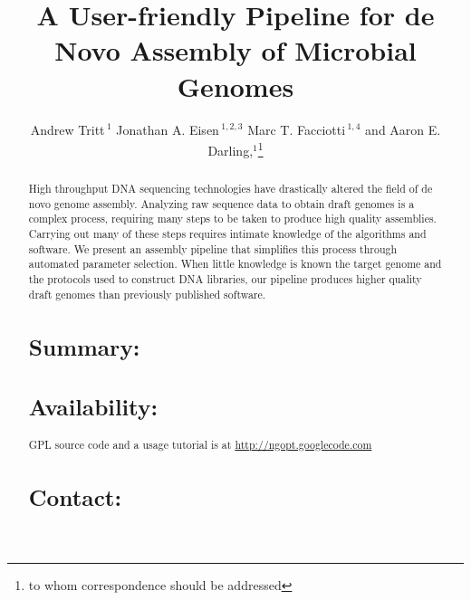 \documentclass{bioinfo}
\begin{document}

\title[a5]{A User-friendly Pipeline for de Novo Assembly of Microbial Genomes}
\author[Tritt \textit{et~al}]{Andrew Tritt\,$^{1}$ Jonathan A. Eisen\,$^{1,2,3}$ Marc T. Facciotti\,$^{1,4}$ and Aaron E. Darling,$^{1}$\footnote{to whom correspondence should be addressed}}
\address{$^{1}$Genome Center, $^{2}$ Dept. of Evolution and Ecology, $^{3}$ Medical Microbiology and Immunology, 
$^{4}$ Biomedical Engineering, University of California-Davis, Davis, CA 95616.}



\maketitle

\begin{abstract}
High throughput DNA sequencing technologies have drastically altered the field of de novo genome assembly. Analyzing
raw sequence data to obtain draft genomes is a complex process, requiring many steps to be taken to produce high
quality assemblies. Carrying out many of these steps requires intimate knowledge of the algorithms and software. 
We present an assembly pipeline that simplifies this process through automated parameter selection. When little
knowledge is known the target genome and the protocols used to construct DNA libraries, our pipeline produces
higher quality draft genomes than previously published software. 

\section{Summary:}
\section{Availability:}
GPL source code and a usage tutorial is at \href{http://ngopt.googlecode.com}{http://ngopt.googlecode.com}

\section{Contact:} \href{rabid apes}{}
\end{abstract}
\end{document}
